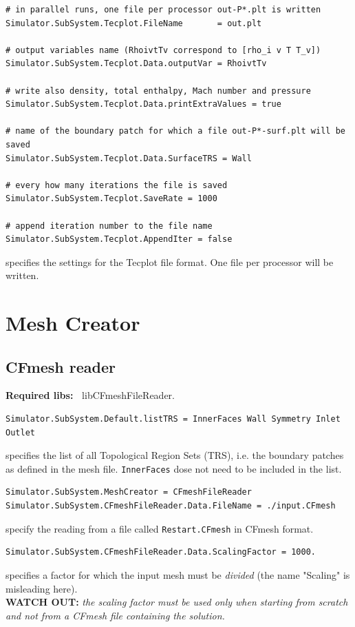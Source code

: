 \documentclass[11pt]{article}
\begin{document}
\begin{lstlisting}[breaklines]
# in parallel runs, one file per processor out-P*.plt is written
Simulator.SubSystem.Tecplot.FileName       = out.plt

# output variables name (RhoivtTv correspond to [rho_i v T T_v])
Simulator.SubSystem.Tecplot.Data.outputVar = RhoivtTv

# write also density, total enthalpy, Mach number and pressure
Simulator.SubSystem.Tecplot.Data.printExtraValues = true  

# name of the boundary patch for which a file out-P*-surf.plt will be saved   
Simulator.SubSystem.Tecplot.Data.SurfaceTRS = Wall   

# every how many iterations the file is saved  
Simulator.SubSystem.Tecplot.SaveRate = 1000

# append iteration number to the file name
Simulator.SubSystem.Tecplot.AppendIter = false       
\end{lstlisting}
specifies the settings for the Tecplot file format. One file per processor will be written. 

\section{Mesh Creator}

\subsection{CFmesh reader}

{\bf Required libs:~} libCFmeshFileReader.

\begin{lstlisting}[breaklines]
Simulator.SubSystem.Default.listTRS = InnerFaces Wall Symmetry Inlet Outlet
\end{lstlisting}
specifies the list of all Topological Region Sets (TRS), i.e. the boundary patches as defined in the mesh file.
{\tt InnerFaces} dose not need to be included in the list.

\begin{lstlisting}[breaklines]
Simulator.SubSystem.MeshCreator = CFmeshFileReader
Simulator.SubSystem.CFmeshFileReader.Data.FileName = ./input.CFmesh
\end{lstlisting}
specify the reading from a file called {\tt Restart.CFmesh} in CFmesh format. 

\begin{lstlisting}[breaklines]
Simulator.SubSystem.CFmeshFileReader.Data.ScalingFactor = 1000. 
\end{lstlisting}
specifies a factor for which the input mesh must be {\it divided} (the name "Scaling" is misleading here). \\
{\bf WATCH OUT:} {\it the scaling factor must be used only when starting from scratch and not from a CFmesh file
  containing the solution.}
  
\end{document}

